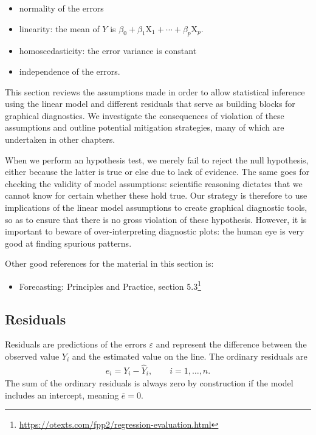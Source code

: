 \documentclass[
  11pt,
  letterpaper,
]{book}
\providecommand{\tightlist}{%
  \setlength{\itemsep}{0pt}\setlength{\parskip}{0pt}}
\renewcommand{\href}[2]{#2\footnote{\url{#1}}}
\theoremstyle{definition}
\theoremstyle{definition}
\theoremstyle{definition}
\theoremstyle{definition}
\theoremstyle{remark}
\begin{document}
\begin{itemize}
\tightlist
\item
  normality of the errors
\item
  linearity: the mean of \(Y\) is \(\beta_0 + \beta_1\mathrm{X}_1 + \cdots + \beta_p \mathrm{X}_p\).
\item
  homoscedasticity: the error variance is constant
\item
  independence of the errors.
\end{itemize}

This section reviews the assumptions made in order to allow statistical inference using the linear model and different residuals that serve as building blocks for graphical diagnostics. We investigate the consequences of violation of these assumptions and outline potential mitigation strategies, many of which are undertaken in other chapters.

When we perform an hypothesis test, we merely fail to reject the null hypothesis, either because the latter is true or else due to lack of evidence. The same goes for checking the validity of model assumptions: scientific reasoning dictates that we cannot know for certain whether these hold true. Our strategy is therefore to use implications of the linear model assumptions to create graphical diagnostic tools, so as to ensure that there is no gross violation of these hypothesis. However, it is important to beware of over-interpreting diagnostic plots: the human eye is very good at finding spurious patterns.

Other good references for the material in this section is:

\begin{itemize}
\tightlist
\item
  \href{https://otexts.com/fpp2/regression-evaluation.html}{Forecasting: Principles and Practice, section 5.3}
\end{itemize}

\hypertarget{residuals}{%
\subsection{Residuals}\label{residuals}}

Residuals are predictions of the errors \(\varepsilon\) and represent the difference between the observed value \(Y_i\) and the estimated value on the line.
The ordinary residuals are
\begin{align*}
e_i=Y_i-\widehat{Y}_i, \qquad i =1, \ldots, n.
\end{align*}
The sum of the ordinary residuals is always zero by construction if the model includes an intercept, meaning \(\overline{e} = 0\).
\end{document}
